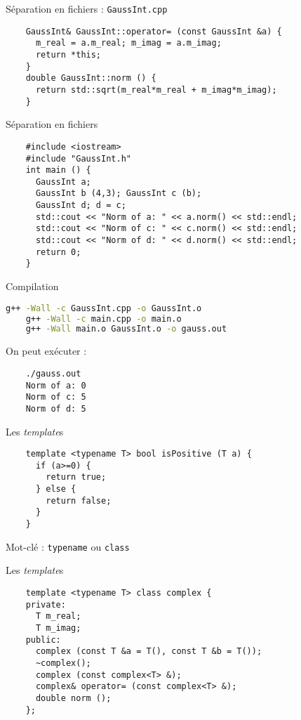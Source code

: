 \begin{frame}[fragile]{Séparation en fichiers : \texttt{GaussInt.cpp}}
  \begin{lstlisting}
    GaussInt& GaussInt::operator= (const GaussInt &a) {
      m_real = a.m_real; m_imag = a.m_imag;
      return *this;
    }
    double GaussInt::norm () {
      return std::sqrt(m_real*m_real + m_imag*m_imag);
    }
  \end{lstlisting}
\end{frame}

\begin{frame}[fragile]{Séparation en fichiers}
  \begin{lstlisting}
    #include <iostream>
    #include "GaussInt.h"
    int main () {
      GaussInt a;
      GaussInt b (4,3); GaussInt c (b);
      GaussInt d; d = c;
      std::cout << "Norm of a: " << a.norm() << std::endl;
      std::cout << "Norm of c: " << c.norm() << std::endl;
      std::cout << "Norm of d: " << d.norm() << std::endl;
      return 0;
    }
  \end{lstlisting}
\end{frame}

\begin{frame}[fragile]{Compilation}
  \begin{lstlisting}[language=bash]
    g++ -Wall -c GaussInt.cpp -o GaussInt.o
    g++ -Wall -c main.cpp -o main.o
    g++ -Wall main.o GaussInt.o -o gauss.out
  \end{lstlisting}

  On peut exécuter :
  \begin{lstlisting}
    ./gauss.out
    Norm of a: 0
    Norm of c: 5
    Norm of d: 5
  \end{lstlisting}
\end{frame}

\begin{frame}[fragile]{Les \textit{template}s}
  \begin{lstlisting}
    template <typename T> bool isPositive (T a) {
      if (a>=0) {
        return true;
      } else {
        return false;
      }
    }
  \end{lstlisting}

  Mot-clé : \texttt{typename} ou \texttt{class}
\end{frame}

\begin{frame}[fragile]{Les \textit{template}s}
  \begin{lstlisting}
    template <typename T> class complex {
    private:
      T m_real;
      T m_imag;
    public:
      complex (const T &a = T(), const T &b = T());
      ~complex();
      complex (const complex<T> &);
      complex& operator= (const complex<T> &);
      double norm ();
    };
  \end{lstlisting}
\end{frame}

